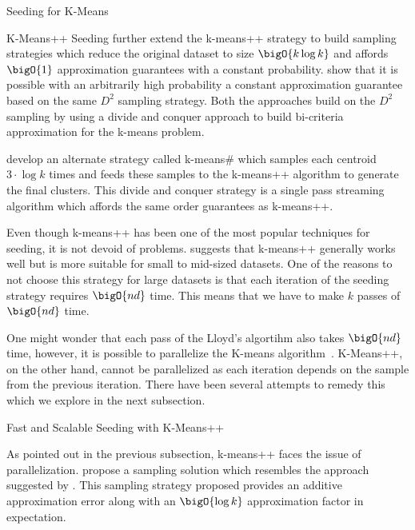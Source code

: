 \documentclass[10pt]{article}
\begin{document}
\begin{psection}{Seeding for K-Means}
\begin{psubsection}{K-Means++ Seeding}
        \citet{stream-kmeanspp} further extend the k-means++ strategy to build sampling
        strategies which reduce the original dataset to size $\bigO{k \log k}$ and
        affords $\bigO{1}$ approximation guarantees with a constant probability. 
        \citet{adaptive-kmeanspp} show that it is possible with an arbitrarily high
        probability a constant approximation guarantee based on the same $D^2$ sampling
        strategy. Both the approaches build on the $D^2$ sampling by using a divide and
        conquer approach to build bi-criteria approximation for the k-means problem.

        \citet{stream-kmeanspp} develop an alternate strategy called k-means\# which
        samples each centroid $3 \cdot \log k$ times and feeds these samples to the
        k-means++ algorithm to generate the final clusters. This divide and conquer
        strategy is a single pass streaming algorithm which affords the same order
        guarantees as k-means++.

        Even though k-means++ has been one of the most popular techniques for seeding,
        it is not devoid of problems. \citet{sami} suggests that k-means++ generally
        works well but is more suitable for small to mid-sized datasets. One of the
        reasons to not choose this strategy for large datasets is that each iteration
        of the seeding strategy requires $\bigO{nd}$ time. This means that we have to
        make $k$ passes of $\bigO{nd}$ time.

        One might wonder that each pass of the Lloyd's algortihm also takes $\bigO{nd}$
        time, however, it is possible to parallelize the K-means
        algorithm~\cite{parallel-kmeans}. K-Means++, on the other hand, cannot be
        parallelized as each iteration depends on the sample from the previous
        iteration. There have been several attempts to remedy
        this~\cite{scalable-kmeanspp, approx-kmeanspp, dist-kmeanspp, fast-kmeanspp}
        which we explore in the next subsection.
    
    \end{psubsection}

    \begin{psubsection}{Fast and Scalable Seeding with K-Means++}
    
        As pointed out in the previous subsection, k-means++ faces the issue of
        parallelization. \citet{scalable-kmeanspp} propose a sampling solution which
        resembles the approach suggested by \citet{stream-kmeanspp}. This sampling
        strategy proposed provides an additive approximation error along with an
        $\bigO{\log k}$ approximation factor in expectation.


\end{psubsection}
\end{psection}
\end{document}
